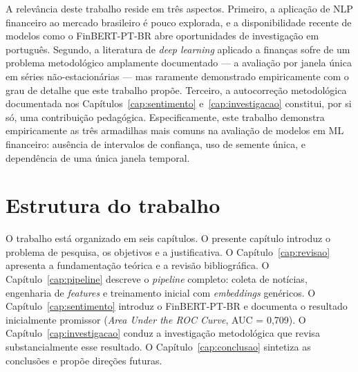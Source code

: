 A relevância deste trabalho reside em três aspectos. Primeiro, a aplicação de NLP financeiro ao mercado brasileiro é pouco explorada, e a disponibilidade recente de modelos como o FinBERT-PT-BR abre oportunidades de investigação em português. Segundo, a literatura de \textit{deep learning} aplicado a finanças sofre de um problema metodológico amplamente documentado --- a avaliação por janela única em séries não-estacionárias \cite{bailey2014,lopezdeprado2018} --- mas raramente demonstrado empiricamente com o grau de detalhe que este trabalho propõe. Terceiro, a autocorreção metodológica documentada nos Capítulos~\ref{cap:sentimento} e~\ref{cap:investigacao} constitui, por si só, uma contribuição pedagógica. Especificamente, este trabalho demonstra empiricamente as três armadilhas mais comuns na avaliação de modelos em ML financeiro: ausência de intervalos de confiança, uso de semente única, e dependência de uma única janela temporal.

\section{Estrutura do trabalho}

O trabalho está organizado em seis capítulos. O presente capítulo introduz o problema de pesquisa, os objetivos e a justificativa. O Capítulo~\ref{cap:revisao} apresenta a fundamentação teórica e a revisão bibliográfica. O Capítulo~\ref{cap:pipeline} descreve o \textit{pipeline} completo: coleta de notícias, engenharia de \textit{features} e treinamento inicial com \textit{embeddings} genéricos. O Capítulo~\ref{cap:sentimento} introduz o FinBERT-PT-BR e documenta o resultado inicialmente promissor (\textit{Area Under the ROC Curve}, AUC = 0,709). O Capítulo~\ref{cap:investigacao} conduz a investigação metodológica que revisa substancialmente esse resultado. O Capítulo~\ref{cap:conclusao} sintetiza as conclusões e propõe direções futuras.



